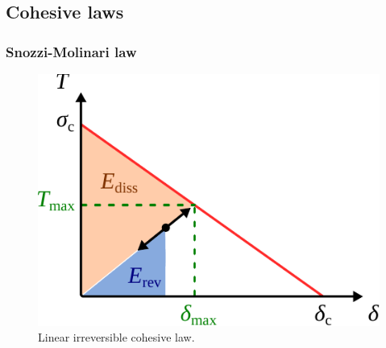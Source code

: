 
\subsection{Cohesive laws}

\subsubsection{Snozzi-Molinari law}

\begin{figure}
  \centering
  \includegraphics[width=.4\textwidth]{figures/law}
  \caption{Linear irreversible cohesive law.}
  \label{fig:smm:coh:linear_cohesive_law}
\end{figure}

